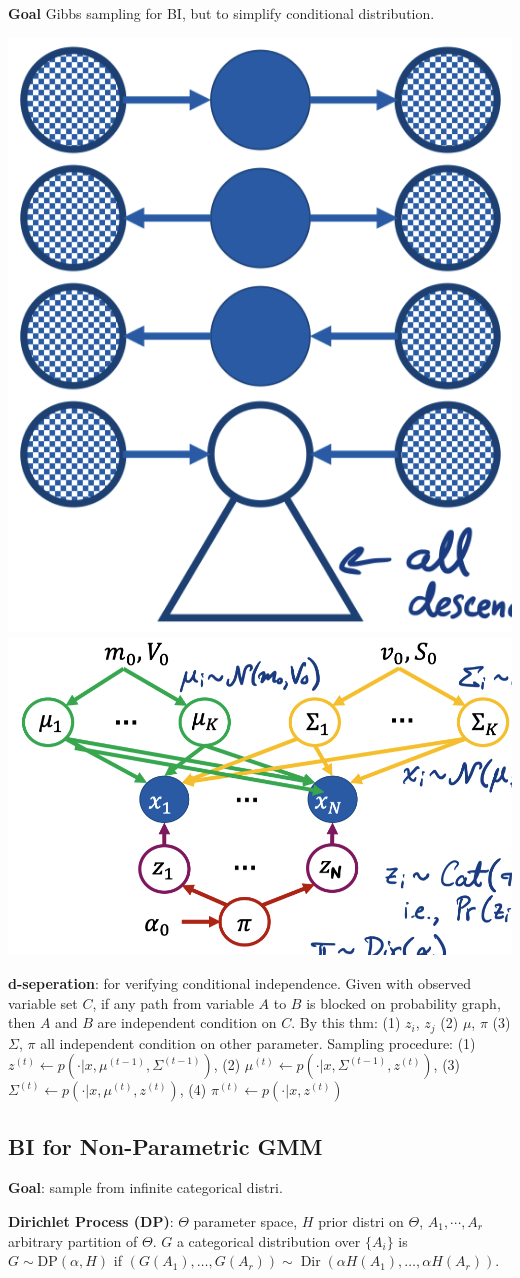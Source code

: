 \textbf{Goal} Gibbs sampling for BI, but to simplify conditional distribution.
\begin{center}
    \includegraphics[width=0.3\columnwidth]{figures/d-sep.png}
    \includegraphics[width=0.50\columnwidth]{figures/GMM.png}
\end{center}

\textbf{d-seperation}: for verifying conditional independence. Given with observed variable set $C$, if any path from variable $A$ to $B$ is blocked on probability graph, then $A$ and $B$ are independent condition on $C$. By this thm: (1) $z_i$, $z_j$ (2) $\mu$, $\pi$  (3) $\Sigma$, $\pi$ all independent condition on other parameter. Sampling procedure: (1) $z^{(t)} \leftarrow p\left(\cdot | x, \mu^{(t-1)}, \Sigma^{(t-1)}\right)$, (2) $\mu^{(t)} \leftarrow p\left(\cdot | x, \Sigma^{(t-1)}, z^{(t)}\right)$, (3) $\Sigma^{(t)} \leftarrow p\left(\cdot | x, \mu^{(t)}, z^{(t)}\right)$, (4) $\pi^{(t)} \leftarrow p\left(\cdot | x, z^{(t)}\right)$

\subsection*{BI for Non-Parametric GMM}
\textbf{Goal}: sample from infinite categorical distri.

\textbf{Dirichlet Process (DP)}: $\Theta$ parameter space, $H$ prior distri on $\Theta$, $A_1, \cdots, A_r$ arbitrary partition of $\Theta$. $G$ a categorical distribution over $\{A_i\}$ is  $G \sim \mathrm{DP}(\alpha, H)$ if $\left(G\left(A_{1}\right), \ldots, G\left(A_{r}\right)\right) \sim \operatorname{Dir}\left(\alpha H\left(A_{1}\right), \ldots, \alpha H\left(A_{r}\right)\right)$.

